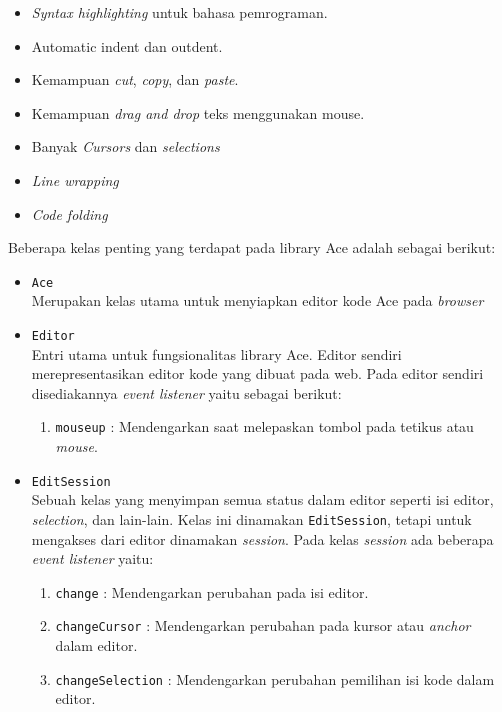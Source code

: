 \documentclass[a4paper,twoside]{article}
\begin{document}
\begin{enumerate}
	      \begin{itemize}
		      \item \textit{Syntax highlighting} untuk bahasa pemrograman.
		      \item Automatic indent dan  outdent.
		      \item Kemampuan \textit{cut}, \textit{copy}, dan \textit{paste}.
		      \item Kemampuan \textit{drag and drop} teks menggunakan mouse.
		      \item Banyak \textit{Cursors} dan \textit{selections}
		      \item \textit{Line wrapping}
		      \item \textit{Code folding}
	      \end{itemize}

	      Beberapa kelas penting yang terdapat pada library Ace adalah sebagai berikut:

	      \begin{itemize}
		      \item \verb|Ace| \\
		            Merupakan kelas utama untuk menyiapkan editor kode Ace pada \textit{browser}
		      \item \verb|Editor| \\
		            Entri utama untuk fungsionalitas library Ace. Editor sendiri merepresentasikan editor kode yang dibuat pada web. Pada editor sendiri disediakannya \textit{event listener} yaitu sebagai berikut:

		            \begin{enumerate}
			            \item \verb|mouseup| : Mendengarkan saat melepaskan tombol pada tetikus atau \textit{mouse}.
		            \end{enumerate}

		      \item \verb|EditSession| \\
		            Sebuah kelas yang menyimpan semua status dalam editor seperti isi editor, \textit{selection}, dan lain-lain. Kelas ini dinamakan \verb|EditSession|, tetapi untuk mengakses dari editor dinamakan \textit{session}. Pada kelas \textit{session} ada beberapa \textit{event listener} yaitu:

		            \begin{enumerate}
			            \item \verb|change| : Mendengarkan perubahan pada isi editor.
			            \item \verb|changeCursor| : Mendengarkan perubahan pada kursor atau \textit{anchor} dalam editor.
			            \item \verb|changeSelection| : Mendengarkan perubahan pemilihan isi kode dalam editor.
		            \end{enumerate}


\end{itemize}
\end{enumerate}
\end{document}
